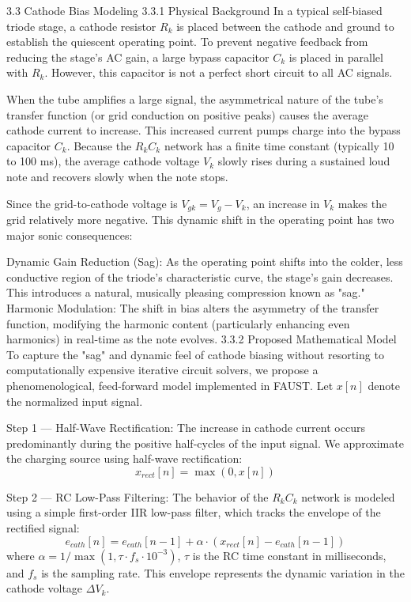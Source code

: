 3.3 Cathode Bias Modeling
3.3.1 Physical Background
In a typical self-biased triode stage, a cathode resistor $R_k$ is placed between the cathode and ground to establish the quiescent operating point. To prevent negative feedback from reducing the stage's AC gain, a large bypass capacitor $C_k$ is placed in parallel with $R_k$. However, this capacitor is not a perfect short circuit to all AC signals.

When the tube amplifies a large signal, the asymmetrical nature of the tube's transfer function (or grid conduction on positive peaks) causes the average cathode current to increase. This increased current pumps charge into the bypass capacitor $C_k$. Because the $R_k C_k$ network has a finite time constant (typically 10 to 100 ms), the average cathode voltage $V_k$ slowly rises during a sustained loud note and recovers slowly when the note stops.

Since the grid-to-cathode voltage is $V_{gk} = V_g - V_k$, an increase in $V_k$ makes the grid relatively more negative. This dynamic shift in the operating point has two major sonic consequences:

Dynamic Gain Reduction (Sag): As the operating point shifts into the colder, less conductive region of the triode's characteristic curve, the stage's gain decreases. This introduces a natural, musically pleasing compression known as "sag."
Harmonic Modulation: The shift in bias alters the asymmetry of the transfer function, modifying the harmonic content (particularly enhancing even harmonics) in real-time as the note evolves.
3.3.2 Proposed Mathematical Model
To capture the "sag" and dynamic feel of cathode biasing without resorting to computationally expensive iterative circuit solvers, we propose a phenomenological, feed-forward model implemented in FAUST. Let $x[n]$ denote the normalized input signal.

Step 1 — Half-Wave Rectification: The increase in cathode current occurs predominantly during the positive half-cycles of the input signal. We approximate the charging source using half-wave rectification: $$ x_{rect}[n] = \max(0, x[n]) \tag{6} $$

Step 2 — RC Low-Pass Filtering: The behavior of the $R_k C_k$ network is modeled using a simple first-order IIR low-pass filter, which tracks the envelope of the rectified signal: $$ e_{cath}[n] = e_{cath}[n-1] + \alpha \cdot (x_{rect}[n] - e_{cath}[n-1]) \tag{7} $$ where $\alpha = 1 / \max(1, \tau \cdot f_s \cdot 10^{-3})$, $\tau$ is the RC time constant in milliseconds, and $f_s$ is the sampling rate. This envelope represents the dynamic variation in the cathode voltage $\Delta V_k$.

